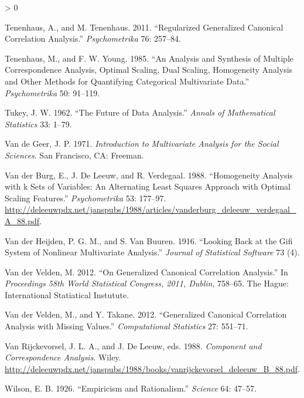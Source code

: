 \documentclass[
  12pt,
]{book}
\newlength{\cslhangindent}
\newenvironment{CSLReferences}[2] %
 {%
  \setlength{\parindent}{0pt}
  \ifodd #1 \everypar{\setlength{\hangindent}{\cslhangindent}}\ignorespaces\fi
  \ifnum #2 > 0
  \setlength{\parskip}{#2\baselineskip}
  \fi
 }%
 {}
\begin{document}
\begin{CSLReferences}{1}{0}
\leavevmode\hypertarget{ref-tenenhaus_tenenhaus_11}{}%
Tenenhaus, A., and M. Tenenhaus. 2011. {``{Regularized Generalized Canonical Correlation Analysis}.''} \emph{Psychometrika} 76: 257--84.

\leavevmode\hypertarget{ref-tenenhaus_young_85}{}%
Tenenhaus, M., and F. W. Young. 1985. {``{An Analysis and Synthesis of Multiple Correspondence Analysis, Optimal Scaling, Dual Scaling, Homogeneity Analysis and Other Methods for Quantifying Categorical Multivariate Data}.''} \emph{Psychometrika} 50: 91--119.

\leavevmode\hypertarget{ref-tukey_62}{}%
Tukey, J. W. 1962. {``{The Future of Data Analysis}.''} \emph{Annals of Mathematical Statistics} 33: 1--79.

\leavevmode\hypertarget{ref-vandegeer_71}{}%
Van de Geer, J. P. 1971. \emph{{Introduction to Multivariate Analysis for the Social Sciences}}. San Francisco, CA: Freeman.

\leavevmode\hypertarget{ref-vanderburg_deleeuw_verdegaal_A_88}{}%
Van der Burg, E., J. De Leeuw, and R. Verdegaal. 1988. {``Homogeneity Analysis with k Sets of Variables: An Alternating Least Squares Approach with Optimal Scaling Features.''} \emph{Psychometrika} 53: 177--97. \url{http://deleeuwpdx.net/janspubs/1988/articles/vanderburg_deleeuw_verdegaal_A_88.pdf}.

\leavevmode\hypertarget{ref-vanderheijden_vanbuuren_16}{}%
Van der Heijden, P. G. M., and S. Van Buuren. 1916. {``Looking Back at the Gifi System of Nonlinear Multivariate Analysis.''} \emph{Journal of Statistical Software} 73 (4).

\leavevmode\hypertarget{ref-vandervelden_12}{}%
Van der Velden, M. 2012. {``On Generalized Canonical Correlation Analysis.''} In \emph{Proceedings 58th World Statistical Congress, 2011, Dublin}, 758--65. The Hague: International Statiatical Instutute.

\leavevmode\hypertarget{ref-vandervelden_takane_12}{}%
Van der Velden, M., and Y. Takane. 2012. {``{Generalized Canonical Correlation Analysis with Missing Values}.''} \emph{Computational Statistics} 27: 551--71.

\leavevmode\hypertarget{ref-vanrijckevorsel_deleeuw_B_88}{}%
Van Rijckevorsel, J. L. A., and J. De Leeuw, eds. 1988. \emph{Component and Correspondence Analysis}. Wiley. \url{http://deleeuwpdx.net/janspubs/1988/books/vanrijckevorsel_deleeuw_B_88.pdf}.

\leavevmode\hypertarget{ref-wilson_26}{}%
Wilson, E. B. 1926. {``{Empiricism and Rationalism}.''} \emph{Science} 64: 47--57.


\end{CSLReferences}
\end{document}
